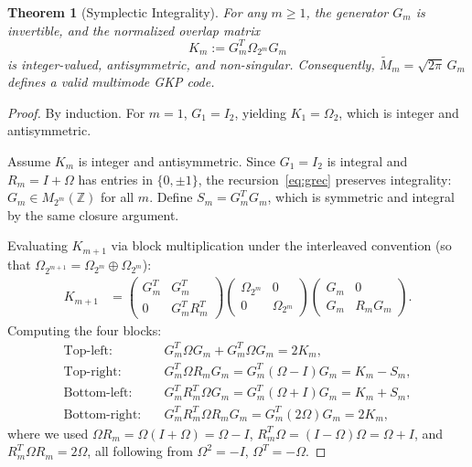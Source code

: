 \documentclass[10pt,a4paper]{amsart}
\newtheorem{theorem}{Theorem}
\newcommand{\symp}{\Omega}
\begin{document}
\begin{theorem}[Symplectic Integrality]\label{thm:main}
For any $m \geq 1$, the generator $G_m$ is invertible, and the normalized overlap matrix
\begin{equation}
K_m := G_m^T \symp_{2^m} G_m
\end{equation}
is integer-valued, antisymmetric, and non-singular. Consequently, $\tilde{M}_m = \sqrt{2\pi}\, G_m$ defines a valid multimode GKP code.
\end{theorem}

\begin{proof}
By induction. For $m=1$, $G_1 = I_2$, yielding $K_1 = \symp_2$, which is integer and antisymmetric.

Assume $K_m$ is integer and antisymmetric. Since $G_1 = I_2$ is integral and $R_m = I + \symp$ has entries in $\{0, \pm 1\}$, the recursion~\eqref{eq:grec} preserves integrality: $G_m \in M_{2^m}(\mathbb{Z})$ for all $m$. Define $S_m = G_m^T G_m$, which is symmetric and integral by the same closure argument.

Evaluating $K_{m+1}$ via block multiplication under the interleaved convention (so that $\symp_{2^{m+1}} = \symp_{2^m} \oplus \symp_{2^m}$):
\begin{align}
K_{m+1} &= \begin{pmatrix} G_m^T & G_m^T \\ 0 & G_m^T R_m^T \end{pmatrix}
           \begin{pmatrix} \symp_{2^m} & 0 \\ 0 & \symp_{2^m} \end{pmatrix}
           \begin{pmatrix} G_m & 0 \\ G_m & R_m G_m \end{pmatrix}.
\end{align}
Computing the four blocks:
\begin{align}
\text{Top-left:}&\quad G_m^T \symp G_m + G_m^T \symp G_m = 2K_m, \nonumber\\
\text{Top-right:}&\quad G_m^T \symp R_m G_m = G_m^T(\symp - I)G_m = K_m - S_m, \nonumber\\
\text{Bottom-left:}&\quad G_m^T R_m^T \symp G_m = G_m^T(\symp + I)G_m = K_m + S_m, \nonumber\\
\text{Bottom-right:}&\quad G_m^T R_m^T \symp R_m G_m = G_m^T (2\symp) G_m = 2K_m, \nonumber
\end{align}
where we used $\symp R_m = \symp(I+\symp) = \symp - I$, $R_m^T \symp = (I-\symp)\symp = \symp + I$, and $R_m^T \symp R_m = 2\symp$, all following from $\symp^2 = -I$, $\symp^T = -\symp$.


\end{proof}
\end{document}

